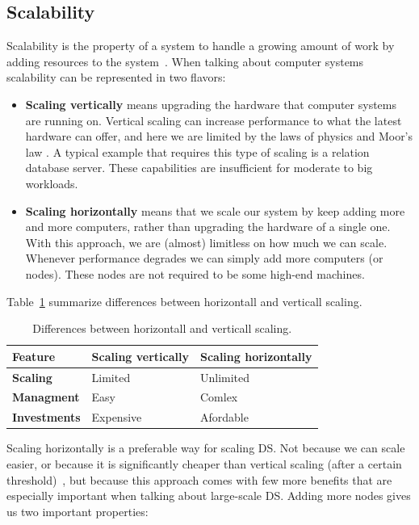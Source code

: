 \subsection{Scalability}\label{sec:scalability}
%
Scalability is the property of a system to handle a growing amount of work by adding resources to the system~\cite{Bondi00}. When talking about computer systems scalability can be represented in two flavors:

\begin{itemize}
	\item \textbf{Scaling vertically} means upgrading the hardware that computer systems are running on. Vertical scaling can increase performance to what the latest hardware can offer, and here we are limited by the laws of physics and Moor's law \cite{Gustafson2011}. A typical example that requires this type of scaling is a relation database server. These capabilities are insufficient for moderate to big workloads.
	\item \textbf{Scaling horizontally} means that we scale our system by keep adding more and more computers, rather than upgrading the hardware of a single one. With this approach, we are (almost) limitless on how much we can scale. Whenever performance degrades we can simply add more computers (or nodes). These nodes are not required to be some high-end machines.
\end{itemize}

Table~\ref{tab:table1} summarize differences between horizontall and verticall scaling.

\begin{table}[h!]
	\begin{center}
		\begin{tabular}{l|l|l}
			\textbf{Feature} & \textbf{Scaling vertically} & \textbf{Scaling horizontally}\\
			\hline
			\textbf{Scaling} & Limited & Unlimited \\
			\textbf{Managment} & Easy & Comlex\\
			\textbf{Investments} & Expensive & Afordable \\
		\end{tabular}
	\end{center}
	\vspace{-0.5cm}
	\caption{Differences between horizontall and verticall scaling.}
	\label{tab:table1}
\end{table}

Scaling horizontally is a preferable way for scaling DS. Not because we can scale easier, or because it is significantly cheaper than vertical scaling (after a certain threshold)~\cite{Bondi00}, but because this approach comes with few more benefits that are especially important when talking about large-scale DS. Adding more nodes gives us two important properties: 

